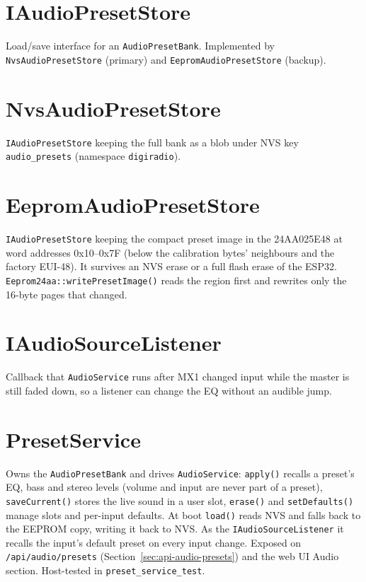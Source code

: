 \section{IAudioPresetStore}\label{cls:IAudioPresetStore}
Load/save interface for an \texttt{AudioPresetBank}. Implemented by
\texttt{NvsAudioPresetStore} (primary) and \texttt{EepromAudioPresetStore}
(backup).

\section{NvsAudioPresetStore}\label{cls:NvsAudioPresetStore}
\texttt{IAudioPresetStore} keeping the full bank as a blob under NVS key
\texttt{audio\_presets} (namespace \texttt{digiradio}).

\section{EepromAudioPresetStore}\label{cls:EepromAudioPresetStore}
\texttt{IAudioPresetStore} keeping the compact preset image in the
24AA025E48 at word addresses 0x10--0x7F (below the calibration bytes'
neighbours and the factory EUI-48). It survives an NVS erase or a full
flash erase of the ESP32. \texttt{Eeprom24aa::writePresetImage()} reads the
region first and rewrites only the 16-byte pages that changed.

\section{IAudioSourceListener}\label{cls:IAudioSourceListener}
Callback that \texttt{AudioService} runs after MX1 changed input while the
master is still faded down, so a listener can change the EQ without an
audible jump.

\section{PresetService}\label{cls:PresetService}
Owns the \texttt{AudioPresetBank} and drives \texttt{AudioService}:
\texttt{apply()} recalls a preset's EQ, bass and stereo levels (volume and
input are never part of a preset), \texttt{saveCurrent()} stores the live
sound in a user slot, \texttt{erase()} and \texttt{setDefaults()} manage
slots and per-input defaults. At boot \texttt{load()} reads NVS and falls
back to the EEPROM copy, writing it back to NVS. As the
\texttt{IAudioSourceListener} it recalls the input's default preset on
every input change. Exposed on \texttt{/api/audio/presets}
(Section~\ref{sec:api-audio-presets}) and the web UI Audio section.
Host-tested in \texttt{preset\_service\_test}.

